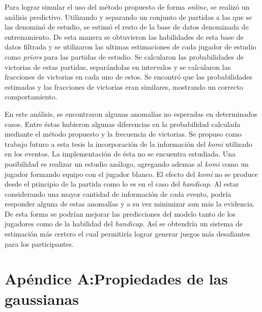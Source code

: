 \documentclass[11pt,twoside,spanish]{report} %
\begin{document}
Para lograr simular el uso del m\'etodo propuesto de forma \textit{online}, se realiz\'o un  an\'alisis predictivo.
Utilizando y separando un conjunto de partidas a las que se las denomin\'o de estudio, se estim\'o el resto de la base de datos denominada de entrenamiento.
De esta manera se obtuvieron las habilidades de esta base de datos filtrada y se utilizaron las ultimas estimaciones de cada jugador de estudio como \textit{priors} para las partidas de estudio.
Se calcularon las probabilidades de victorias de estas partidas, separ\'andolas en intervalos y se calcularon las fracciones de victorias en cada uno de estos.
Se encontr\'o que las probabilidades estimadas y las fracciones de victorias eran similares, mostrando un correcto comportamiento.

En este an\'alisis, se encontraron algunas anomal\'ias no esperadas en determinados casos.
Entre \'estas hubieron algunas diferencias en la probabilidad calculada mediante el m\'etodo propuesto y la frecuencia de victorias.
Se propuso como trabajo futuro a esta tesis la incorporaci\'on de la informaci\'on del \textit{komi} utilizado en los eventos.
La implementaci\'on de \'esta no se encuentra estudiada.
Una posibilidad es realizar un estudio an\'alogo, agregando ademas al \textit{komi} como un jugador formando equipo con el jugador blanco.
El efecto del \textit{komi} no se produce desde el principio de la partida como lo es en el caso del \textit{handicap}.
Al estar considerando una mayor cantidad de informaci\'on de cada evento, podr\'ia responder alguna de estas anomal\'ias y a su vez minimizar aun m\'as la evidencia.
De esta forma se podr\'ian mejorar las predicciones del modelo tanto de los jugadores como de la habilidad del \textit{handicap}.
As\'i se obtendr\'ia un sistema de estimaci\'on m\'as certero el cual permitir\'ia lograr generar juegos m\'as desafiantes para los participantes.








\appendix
\chapter{Ap\'endice A:Propiedades de las gaussianas}
%
\label{appendix:gauss}
\end{document}
